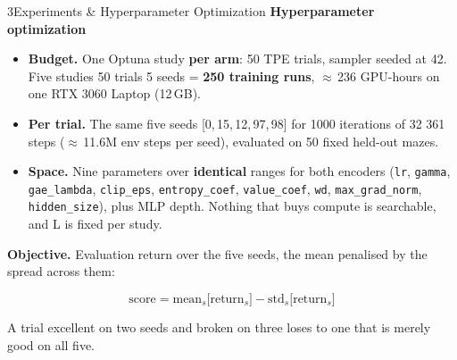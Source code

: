 \documentclass[final]{article}
\newcommand{\pbodys}{\fontsize{24}{31}\selectfont}
\newcommand{\pcap}{\fontsize{21}{27}\selectfont\color{mutedgrey}}
\newcommand{\phead}[1]{{\fontsize{29}{36}\selectfont\bfseries\color{luhblue}#1}%
  \par\vspace{3mm}}
\newcommand{\Lw}{L}
\newcommand{\tx}{\texttimes}
\newcommand{\mono}[1]{\texttt{#1}}
\newlength{\rcolw}\setlength{\rcolw}{502mm}
\newlength{\colh}\setlength{\colh}{985mm}
\newcommand{\panelgap}{\vspace{10mm}\vfill}
\begin{document}
\begin{minipage}[t][\colh][s]{\rcolw}
\begin{panel}{3}{Experiments \& Hyperparameter Optimization}
  \phead{Hyperparameter optimization}
  {\pbodys
   \begin{itemize}[leftmargin=8mm,itemsep=4mm,topsep=0mm,parsep=0pt]
     \item \textbf{Budget.} One Optuna study \textbf{per arm}: 50 TPE trials,
           sampler seeded at 42. Five studies \tx{} 50 trials \tx{} 5 seeds =
           \textbf{250 training runs}, \ensuremath{\approx}\,236 GPU-hours on
           one RTX 3060 Laptop (12\,GB).
     \item \textbf{Per trial.} The same five seeds [0,\,15,\,12,\,97,\,98] for
           1000 iterations of 32\,\tx\,361 steps
           (\ensuremath{\approx}\,11.6M env steps per seed), evaluated on 50
           fixed held-out mazes.
     \item \textbf{Space.} Nine parameters over \textbf{identical} ranges for
           both encoders (\mono{lr}, \mono{gamma}, \mono{gae\_lambda},
           \mono{clip\_eps}, \mono{entropy\_coef}, \mono{value\_coef},
           \mono{wd}, \mono{max\_grad\_norm}, \mono{hidden\_size}), plus MLP
           depth. Nothing that buys compute is searchable, and \Lw{} is fixed
           per study.
   \end{itemize}\par}
  \vspace{4mm}
  {\pbodys \textbf{Objective.} Evaluation return over the five seeds, the
   mean penalised by the spread across them:\par}
  {\pbodys
   \begin{equation*}
     \mathrm{score} = \mathrm{mean}_s\big[\text{return}_s\big]
                    - \mathrm{std}_s\big[\text{return}_s\big]
   \end{equation*}\par}
  {\pcap A trial excellent on two seeds and broken on three loses to one that
   is merely good on all five.\par}
\end{panel}

\panelgap


\end{minipage}
\end{document}
